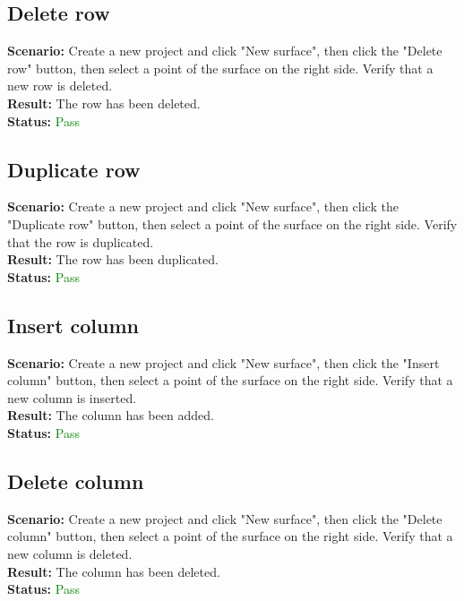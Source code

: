 \documentclass[a4paper, 11pt, article]{report}
\begin{document}
\subsection{Delete row}

\noindent \textbf{Scenario:} Create a new project and click "New surface", then click the "Delete row" button, then select a point of the surface on the right side. Verify that a new row is deleted.
\\
\noindent \textbf{Result:} The row has been deleted.
\\
\noindent \textbf{Status:} \textcolor{green}{Pass}

\subsection{Duplicate row}

\noindent \textbf{Scenario:} Create a new project and click "New surface", then click the "Duplicate row" button, then select a point of the surface on the right side. Verify that the row is duplicated.
\\
\noindent \textbf{Result:} The row has been duplicated.
\\
\noindent \textbf{Status:} \textcolor{green}{Pass}

\subsection{Insert column}

\noindent \textbf{Scenario:} Create a new project and click "New surface", then click the "Insert column" button, then select a point of the surface on the right side. Verify that a new column is inserted.
\\
\noindent \textbf{Result:} The column has been added.
\\
\noindent \textbf{Status:} \textcolor{green}{Pass}

\subsection{Delete column}

\noindent \textbf{Scenario:} Create a new project and click "New surface", then click the "Delete column" button, then select a point of the surface on the right side. Verify that a new column is deleted.
\\
\noindent \textbf{Result:} The column has been deleted.
\\
\noindent \textbf{Status:} \textcolor{green}{Pass}
\end{document}
